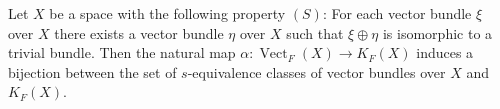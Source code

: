 Let $X$ be a space with the following property $(S)$: For each vector bundle $\xi$ over $X$ there exists a vector bundle $\eta$ over $X$ such that $\xi \oplus \eta$ is isomorphic to a trivial bundle. Then the natural map $\alpha: \operatorname{Vect}_F(X) \to K_F(X)$ induces a bijection between the set of $s$-equivalence classes of vector bundles over $X$ and $K_F(X)$.
